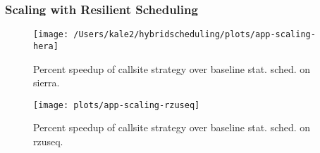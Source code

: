 \begin{frame}
\frametitle{Scaling with Resilient Scheduling}
\begin{figure}[h]
\label{fig:app-scaling-hera}
\begin{center}
\texttt{[image: /Users/kale2/hybridscheduling/plots/app-scaling-hera]}
\end{center}


\begin{center}
\tiny Percent speedup of callsite strategy over baseline stat. sched. on sierra.
\end{center}
\end{figure}

\begin{figure}[h]
\label{fig:app-scaling-rzuseq}
\begin{center}
\texttt{[image: plots/app-scaling-rzuseq]}

\end{center}
\begin{center}
\tiny Percent speedup of callsite strategy over baseline stat. sched. on rzuseq.
\end{center}
\end{figure}

\end{frame}


